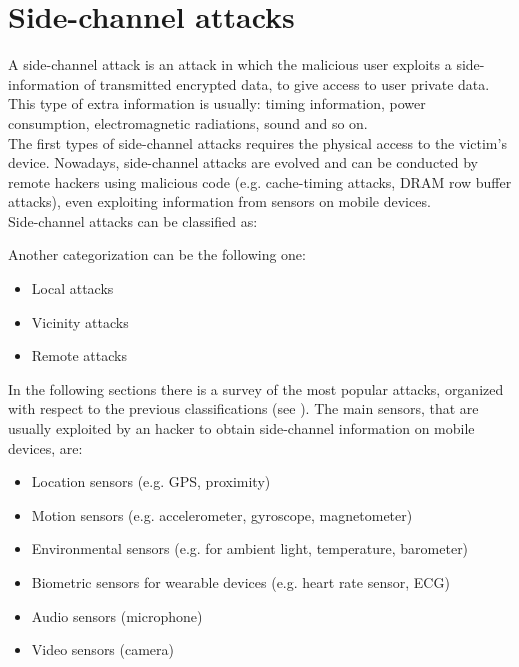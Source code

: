 \chapter{Side-channel attacks}\label{chapter:SideCH}
A side-channel attack is an attack in which the malicious user exploits a side-information of transmitted encrypted data, to give access to user private data. 
This type of extra information is usually: timing information, power consumption, electromagnetic radiations, sound and so on.\\
The first types of side-channel attacks requires the physical access to the victim's device. Nowadays, side-channel attacks are evolved and can be conducted by remote hackers using malicious code (e.g. cache-timing attacks, DRAM row buffer attacks), even exploiting information from sensors on mobile devices\cite{side_classification}.\\
Side-channel attacks can be classified as:
\begin{itemize}
\end{itemize}
Another categorization can be the following one:
\begin{itemize}
\item{Local attacks}
\item{Vicinity attacks}
\item{Remote attacks}
\end{itemize}
In the following sections there is a survey of the most popular attacks, organized with respect to the previous classifications (see ). 
The main sensors, that are usually exploited by an hacker to obtain side-channel information on mobile devices, are\cite{side_attacks}:
\begin{itemize}
\item{Location sensors (e.g. GPS, proximity)}
\item{Motion sensors (e.g. accelerometer, gyroscope, magnetometer)}
\item{Environmental sensors (e.g. for ambient light, temperature, barometer)}
\item{Biometric sensors for wearable devices (e.g. heart rate sensor, ECG)}
\item{Audio sensors (microphone)}
\item{Video sensors (camera)}
\end{itemize}

